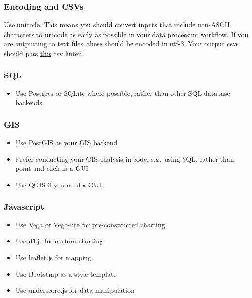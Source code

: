 \documentclass[]{book}
\providecommand{\tightlist}{%
  \setlength{\itemsep}{0pt}\setlength{\parskip}{0pt}}
\begin{document}
\hypertarget{encoding-and-csvs}{%
\subsubsection*{Encoding and CSVs}\label{encoding-and-csvs}}

Use unicode. This means you should convert inputs that include non-ASCII characters to unicode as early as possible in your data processing workflow. If you are outputting to text files, these should be encoded in utf-8. Your output csvs should pass \href{https://csvlint.io/}{this} csv linter.

\hypertarget{sql}{%
\subsubsection*{SQL}\label{sql}}

\begin{itemize}
\tightlist
\item
  Use Postgres or SQLite where possible, rather than other SQL database backends.
\end{itemize}

\hypertarget{gis}{%
\subsubsection*{GIS}\label{gis}}

\begin{itemize}
\tightlist
\item
  Use PostGIS as your GIS backend
\item
  Prefer conducting your GIS analysis in code, e.g.~using SQL, rather than point and click in a GUI
\item
  Use QGIS if you need a GUI.
\end{itemize}

\hypertarget{javascript}{%
\subsubsection*{Javascript}\label{javascript}}

\begin{itemize}
\tightlist
\item
  Use Vega or Vega-lite for pre-constructed charting
\item
  Use d3.js for custom charting
\item
  Use leaflet.js for mapping.
\item
  Use Bootstrap as a style template
\item
  Use underscore.js for data manipulation
\end{itemize}
\end{document}
